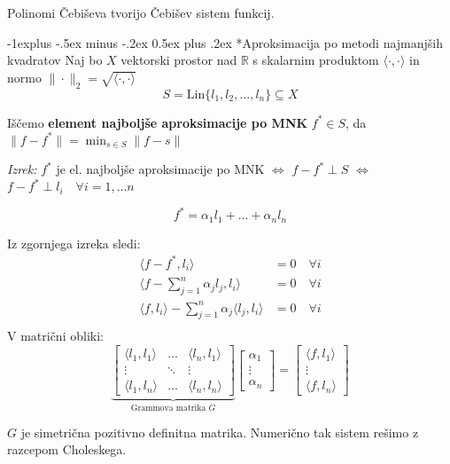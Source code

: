\documentclass[a3paper,8pt]{extarticle}
\makeatletter
\renewcommand{\subsection}{\@startsection{subsection}{2}{0mm}%
                                {-1explus -.5ex minus -.2ex}%
                                {0.5ex plus .2ex}%
                                {\normalfont\normalsize\bfseries}}
\makeatother
\begin{document}
\begin{multicols}{5}
Polinomi Čebiševa tvorijo Čebišev sistem funkcij.

\subsection*{Aproksimacija po metodi najmanjših kvadratov}
Naj bo $X$ vektorski prostor nad $\mathbb{R}$ s skalarnim produktom $\langle \cdot, \cdot \rangle$ in normo $\| \cdot \|_2 = \sqrt{\langle \cdot, \cdot \rangle}$ 
\[ S = \text{Lin}\{l_1, l_2, \dots, l_n\} \subseteq X \]

Iščemo \textbf{element najboljše aproksimacije po MNK} $f^* \in S$, da $\| f - f^* \| = \min_{s \in S} \| f - s \| $

\textit{Izrek:} $f^*$ je el. najboljše aproksimacije po MNK $\iff$ $f-f^* \perp S$ $\iff$
$f-f^* \perp l_i \quad \forall i = 1,\dots n$

\[ f^* = \alpha_1 l_1 + \dots + \alpha_n l_n\]

Iz zgornjega izreka sledi:
\begin{align*}
\langle f - f^*, l_i \rangle &= 0 \quad \forall i\\
\langle f - \sum_{j=1}^n \alpha_j l_j, l_i \rangle &= 0 \quad \forall i\\
\langle f, l_i\rangle - \sum_{j=1}^n \alpha_j \langle  l_j, l_i \rangle &= 0 \quad \forall i\\
\end{align*}
V matrični obliki:
\[
    \underbrace{\begin{bmatrix}
        \langle l_1, l_1 \rangle & \dots & \langle l_n, l_1 \rangle \\
        \vdots & \ddots & \vdots \\
        \langle l_1, l_n \rangle & \dots & \langle l_n, l_n \rangle
    \end{bmatrix}}_{\text{Grammova matrika $G$}}
    \begin{bmatrix}
        \alpha_1 \\
        \vdots \\
        \alpha_n
    \end{bmatrix}
    =
    \begin{bmatrix}
        \langle f, l_1 \rangle \\
        \vdots \\
        \langle f, l_n \rangle
    \end{bmatrix}
\]

$G$ je simetrična pozitivno definitna matrika. Numerično tak sistem rešimo z razcepom Choleskega.



\end{multicols}
\end{document}
